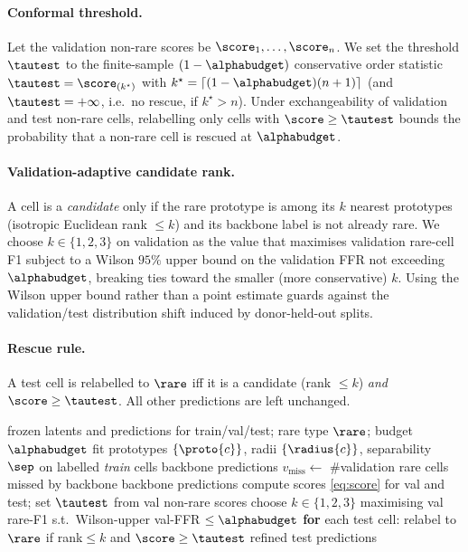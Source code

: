 \paragraph{Conformal threshold.} Let the validation non-rare scores be $\score_1,\dots,\score_n$. We set the
threshold $\tautest$ to the finite-sample $(1-\alphabudget)$ conservative order statistic
$\tautest=\score_{(k^\star)}$ with $k^\star=\lceil(1-\alphabudget)(n+1)\rceil$ (and $\tautest=+\infty$, i.e.\ no
rescue, if $k^\star>n$). Under exchangeability of validation and test non-rare cells, relabelling only cells with
$\score\ge\tautest$ bounds the probability that a non-rare cell is rescued at $\alphabudget$.

\paragraph{Validation-adaptive candidate rank.} A cell is a \emph{candidate} only if the rare prototype is among its
$k$ nearest prototypes (isotropic Euclidean rank $\le k$) and its backbone label is not already rare. We choose
$k\in\{1,2,3\}$ on validation as the value that maximises validation rare-cell F1 subject to a Wilson $95\%$ upper
bound on the validation FFR not exceeding $\alphabudget$, breaking ties toward the smaller (more conservative) $k$.
Using the Wilson upper bound rather than a point estimate guards against the validation/test distribution shift
induced by donor-held-out splits.

\paragraph{Rescue rule.} A test cell is relabelled to $\rare$ iff it is a candidate (rank $\le k$) \emph{and}
$\score\ge\tautest$. All other predictions are left unchanged.

\begin{algorithm}[t]
\caption{scRareRefine conformal rescue (inductive)}
\label{alg:rescue}
\begin{algorithmic}[1]
\Require frozen latents and predictions for train/val/test; rare type $\rare$; budget $\alphabudget$
\State fit prototypes $\{\proto{c}\}$, radii $\{\radius{c}\}$, separability $\sep$ on labelled \emph{train} cells
 \Return backbone predictions 
\EndIf
\State $v_{\mathrm{miss}}\gets$ \#validation rare cells missed by backbone
 \Return backbone predictions 
\EndIf
\State compute scores \cref{eq:score} for val and test; set $\tautest$ from val non-rare scores
\State choose $k\in\{1,2,3\}$ maximising val rare-F1 s.t.\ Wilson-upper val-FFR $\le\alphabudget$
\State \textbf{for} each test cell: relabel to $\rare$ if rank$\le k$ and $\score\ge\tautest$
\State \Return refined test predictions
\end{algorithmic}
\end{algorithm}

